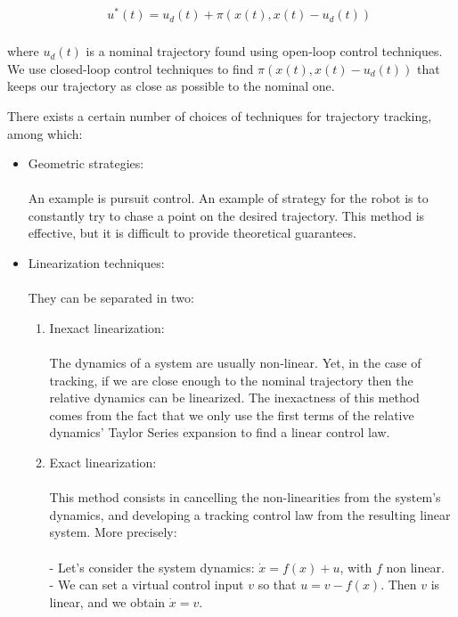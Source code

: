 \documentclass[twoside]{article}
\begin{document}
\begin{equation} \label{constrained}
\begin{split}
\: \: &u^*(t) = u_d(t) + \pi(x(t), x(t)-u_d(t)) \\
\end{split}
\end{equation}

where $u_d(t)$ is a nominal trajectory found using open-loop control techniques. We use closed-loop control techniques to find $\pi(x(t), x(t)-u_d(t))$ that keeps our trajectory as close as possible to the nominal one.

There exists a certain number of choices of techniques for trajectory tracking, among which:

\begin{itemize}
  \item Geometric strategies: \\
  \\ An example is pursuit control. An example of strategy for the robot is to constantly try to chase a point on the desired trajectory. This method is effective, but it is difficult to provide theoretical guarantees.
  \item Linearization techniques: \\
  \\ They can be separated in two:
  \begin{enumerate}
    \item Inexact linearization: \\ 
    \\
    The dynamics of a system are usually non-linear. Yet, in the case of tracking, if we are close enough to the nominal trajectory then the relative dynamics can be linearized. The inexactness of this method comes from the fact that we only use the first terms of the relative dynamics' Taylor Series expansion to find a linear control law. 
    \\
    \item Exact linearization: \\ 
    \\
    This method consists in cancelling the non-linearities from the system's dynamics, and developing a tracking control law from the resulting linear system. More precisely: \\ 
    \\
    - Let's consider the system dynamics: $\dot{x} = f(x) + u$, with $f$ non linear.\\
     - We can set a virtual control input $v$ so that $u = v - f(x)$. Then $v$ is linear, and we obtain $\dot{x} = v$. \\

\end{enumerate}
\end{itemize}
\end{document}
